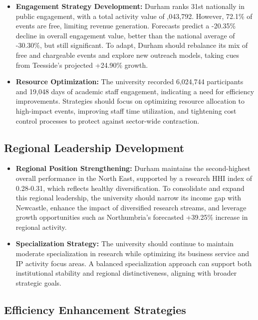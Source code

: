 \documentclass[journal,onecolumn, 10pt,draftclsnofoot]{IEEEtran}
\begin{document}
\begin{itemize}
    \item \textbf{Engagement Strategy Development:} Durham ranks 31st nationally in public engagement, with a total activity value of ,043,792. However, 72.1\% of events are free, limiting revenue generation. Forecasts predict a -20.35\% decline in overall engagement value, better than the national average of -30.30\%, but still significant. To adapt, Durham should rebalance its mix of free and chargeable events and explore new outreach models, taking cues from Teesside's projected +24.90\% growth.
    
    \item \textbf{Resource Optimization:} The university recorded 6,024,744 participants and 19,048 days of academic staff engagement, indicating a need for efficiency improvements. Strategies should focus on optimizing resource allocation to high-impact events, improving staff time utilization, and tightening cost control processes to protect against sector-wide contraction.
\end{itemize}

\subsection{Regional Leadership Development}

\begin{itemize}
    \item \textbf{Regional Position Strengthening:} Durham maintains the second-highest overall performance in the North East, supported by a research HHI index of 0.28-0.31, which reflects healthy diversification. To consolidate and expand this regional leadership, the university should narrow its income gap with Newcastle, enhance the impact of diversified research streams, and leverage growth opportunities such as Northumbria's forecasted +39.25\% increase in regional activity.
    
    \item \textbf{Specialization Strategy:} The university should continue to maintain moderate specialization in research while optimizing its business service and IP activity focus areas. A balanced specialization approach can support both institutional stability and regional distinctiveness, aligning with broader strategic goals.
\end{itemize}

\subsection{Efficiency Enhancement Strategies}
\end{document}
